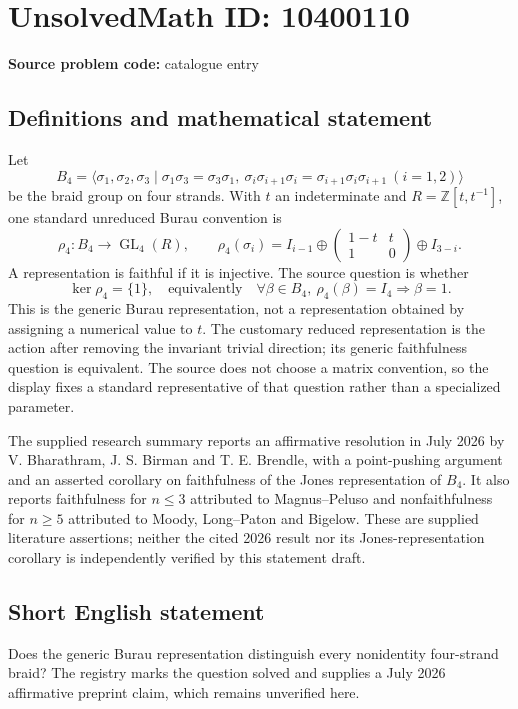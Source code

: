 \documentclass[11pt]{article}
\newcommand{\Z}{\mathbb{Z}}
\begin{document}
\section*{UnsolvedMath ID: 10400110}
\textbf{Source problem code:} catalogue entry
\subsection{Definitions and mathematical statement}
Let
\[B_4=\langle\sigma_1,\sigma_2,\sigma_3\mid \sigma_1\sigma_3=\sigma_3\sigma_1,\ \sigma_i\sigma_{i+1}\sigma_i=\sigma_{i+1}\sigma_i\sigma_{i+1}\ (i=1,2)\rangle\]
be the braid group on four strands. With \(t\) an indeterminate and \(R=\Z[t,t^{-1}]\), one standard unreduced Burau convention is
\[\rho_4:B_4\longrightarrow\operatorname{GL}_4(R),\qquad
\rho_4(\sigma_i)=I_{i-1}\oplus\begin{pmatrix}1-t&t\\1&0\end{pmatrix}\oplus I_{3-i}.\]
A representation is faithful if it is injective. The source question is whether
\[\ker\rho_4=\{1\},\quad\text{equivalently}\quad
\forall\beta\in B_4,\ \rho_4(\beta)=I_4\Longrightarrow\beta=1.\]
This is the generic Burau representation, not a representation obtained by assigning a numerical value to \(t\). The customary reduced representation is the action after removing the invariant trivial direction; its generic faithfulness question is equivalent. The source does not choose a matrix convention, so the display fixes a standard representative of that question rather than a specialized parameter.

The supplied research summary reports an affirmative resolution in July 2026 by V. Bharathram, J. S. Birman and T. E. Brendle, with a point-pushing argument and an asserted corollary on faithfulness of the Jones representation of \(B_4\). It also reports faithfulness for \(n\leq3\) attributed to Magnus--Peluso and nonfaithfulness for \(n\geq5\) attributed to Moody, Long--Paton and Bigelow. These are supplied literature assertions; neither the cited 2026 result nor its Jones-representation corollary is independently verified by this statement draft.
\subsection{Short English statement}
Does the generic Burau representation distinguish every nonidentity four-strand braid? The registry marks the question solved and supplies a July 2026 affirmative preprint claim, which remains unverified here.
\end{document}
